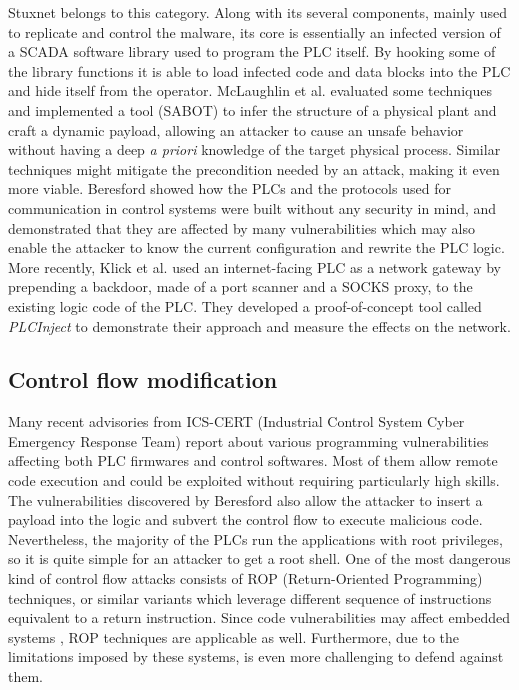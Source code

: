 Stuxnet \cite{stuxnet} belongs to this category. Along with its several components, mainly used to replicate and control the malware,
its core is essentially an infected version of a SCADA software library used to program the PLC itself.
By hooking some of the library functions it is able to load infected code and data blocks into the PLC and hide itself from the operator.
McLaughlin et al. \cite{dynamic-payload,sabot} evaluated some techniques and implemented a tool (SABOT) to infer the structure of a physical plant and craft a dynamic payload,
allowing an attacker to cause an unsafe behavior without having a deep \emph{a priori} knowledge of the target physical process.
Similar techniques might mitigate the precondition needed by an attack, making it even more viable.
Beresford \cite{siemens-s7} showed how the PLCs and the protocols used for communication in control systems were built without any security in mind,
and demonstrated that they are affected by many vulnerabilities which may also enable the attacker to know the current configuration and rewrite the PLC logic.
More recently, Klick et al. \cite{plc-network} used an internet-facing PLC as a network gateway by prepending a backdoor, made of a port scanner and a SOCKS proxy,
to the existing logic code of the PLC. They developed a proof-of-concept tool called \emph{PLCInject} to demonstrate their approach and measure the effects on the network.


\subsection{Control flow modification}

Many recent advisories \cite{schneider-bof,rockwell-vuln,rockwell-vuln2,elcsoft-vuln} from ICS-CERT (Industrial Control System Cyber Emergency Response Team)
report about various programming vulnerabilities affecting both PLC firmwares and control softwares. Most of them allow remote code execution and could be exploited
without requiring particularly high skills.
The vulnerabilities discovered by Beresford \cite{siemens-s7} also allow the attacker to insert a payload into the logic and subvert the control flow to execute
malicious code. Nevertheless, the majority of the PLCs run the applications with root privileges, so it is quite simple for an attacker to get a root shell.
One of the most dangerous kind of control flow attacks consists of ROP (Return-Oriented Programming) techniques, or similar variants \cite{jop,no-ret}
which leverage different sequence of instructions equivalent to a return instruction.
Since code vulnerabilities may affect embedded systems \cite{schneider-bof,rockwell-vuln,rockwell-vuln2,elcsoft-vuln,siemens-s7}, ROP techniques
are applicable as well. Furthermore, due to the limitations imposed by these systems, is even more challenging to defend against them.


